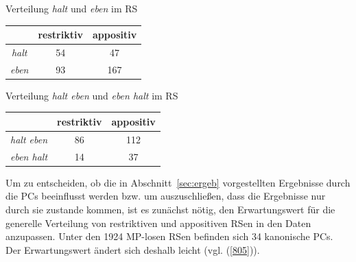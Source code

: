 \begin{exe}
	\ex\label{803} Verteilung \textit{halt} und \textit{eben} im RS\\[-1em]
     \begin{tabular}[t]{|c|c|c|}
     \hline
	 {} & restriktiv & appositiv\\
	 \hline
	 \textit{halt} & 54 & 47\\
	 \hline	 
	 \textit{eben} & 93 & 167\\
	 \hline    
     \end{tabular}
\end{exe}                    				

\begin{exe}
	\ex\label{804} Verteilung \textit{halt eben} und \textit{eben halt} im RS\\[-1em]
     \begin{tabular}[t]{|c|c|c|}
     \hline
	 {} & restriktiv & appositiv\\
	 \hline
	 \textit{halt eben} & 86 & 112\\
	 \hline	 
	 \textit{eben halt} & 14 & 37\\
	 \hline    
     \end{tabular}
\end{exe}                    				
Um zu entscheiden, ob die in Abschnitt~\ref{sec:ergeb} vorgestellten Ergebnisse durch die PCs beeinflusst werden bzw. um auszuschließen, dass die Ergebnisse nur durch sie zustande kommen, ist es zunächst nötig, den Erwartungswert für die generelle Verteilung von restriktiven und appositiven RSen in den Daten anzupassen. Unter den 1924 MP-losen RSen befinden sich 34 kanonische PCs. Der Erwartungswert ändert sich deshalb leicht (vgl. (\ref{805})).

